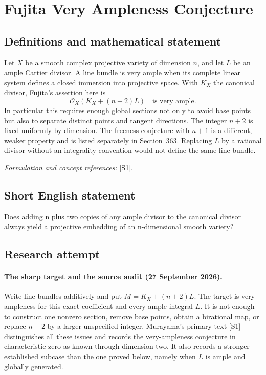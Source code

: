 \documentclass[11pt]{article}
\begin{document}
\section*{\texorpdfstring{Fujita Very Ampleness Conjecture}{Fujita Very Ampleness Conjecture}}\label{30006956}
\subsection{Definitions and mathematical statement}
Let $X$ be a smooth complex projective variety of dimension $n$, and let $L$ be an ample Cartier divisor. A line bundle is very ample when its complete linear system defines a closed immersion into projective space. With $K_X$ the canonical divisor, Fujita's assertion here is
\[
 \mathcal O_X(K_X+(n+2)L)\quad\text{is very ample}.
\]
In particular this requires enough global sections not only to avoid base points but also to separate distinct points and tangent directions. The integer $n+2$ is fixed uniformly by dimension. The freeness conjecture with $n+1$ is a different, weaker property and is listed separately in Section~\href{https://mehmetmars7.github.io/Erdosproblems-llm-hunter/problem.html?type=open_problems&id=problem.fujita-freeness-conjecture}{363}. Replacing $L$ by a rational divisor without an integrality convention would not define the same line bundle.
\par\smallskip\textit{Formulation and concept references:} \href{https://arxiv.org/abs/2408.06530}{[S1]}.

\subsection{Short English statement}
Does adding n plus two copies of any ample divisor to the canonical divisor always yield a projective embedding of an n-dimensional smooth variety?
\subsection{Research attempt}

\paragraph{The sharp target and the source audit (27 September 2026).}
Write line bundles additively and put $M=K_X+(n+2)L$. The target is
very ampleness for this exact coefficient and every ample integral $L$.
It is not enough to construct one nonzero section, remove base points,
obtain a birational map, or replace $n+2$ by a larger unspecified integer.
Murayama's primary text [S1] distinguishes all these issues and records
the very-ampleness conjecture in characteristic zero as known through
dimension two. It also records a stronger established subcase than the
one proved below, namely when $L$ is ample and globally generated.
\end{document}
